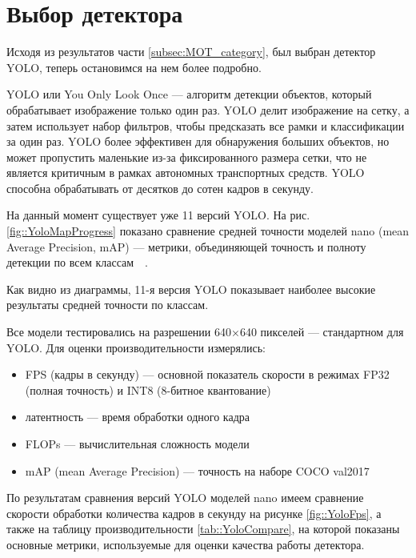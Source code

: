 \section{Выбор детектора}

Исходя из результатов части \ref{subsec:MOT_category}, был выбран детектор YOLO, теперь остановимся на нем более подробно. 

YOLO или You Only Look Once — алгоритм детекции объектов, который обрабатывает
изображение только один раз. YOLO делит изображение на сетку, а затем использует
набор фильтров, чтобы предсказать все рамки и классификации за один раз. YOLO 
более эффективен для обнаружения больших объектов, но может пропустить маленькие
из-за фиксированного размера сетки, что не является критичным в рамках автономных
транспортных средств. YOLO способна обрабатывать от десятков до сотен кадров в секунду.

На данный момент существует уже 11 версий YOLO. На рис. \ref{fig::YoloMapProgress} показано сравнение средней точности моделей nano (mean Average Precision, mAP) — метрики, объединяющей точность и полноту детекции по всем классам~\cite{article::Hussain2023}~\cite{site::YoloCompare}.


Как видно из диаграммы, 11-я версия YOLO показывает наиболее высокие результаты 
средней точности по классам.

Все модели тестировались на разрешении 640×640 пикселей — стандартном для YOLO. Для оценки производительности измерялись:

\begin{itemize}
    \item FPS (кадры в секунду) — основной показатель скорости в режимах FP32 (полная точность) и INT8 (8-битное квантование)
    \item латентность — время обработки одного кадра
    \item FLOPs — вычислительная сложность модели
    \item mAP (mean Average Precision) — точность на наборе COCO val2017
\end{itemize}

По результатам сравнения версий YOLO моделей nano имеем сравнение скорости обработки количества кадров в секунду на рисунке \ref{fig::YoloFps}, а также на таблицу производительности \ref{tab::YoloCompare}, на которой показаны основные метрики, используемые для оценки качества работы детектора.

